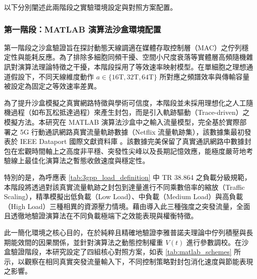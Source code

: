 以下分別闡述此兩階段之實驗環境設定與對照方案配置。

\subsubsection{第一階段：MATLAB 演算法沙盒環境配置}
第一階段之沙盒驗證旨在探討動態天線調適在媒體存取控制層（MAC）之佇列穩定性與能耗反應。為了排除多細胞同頻干擾、空間小尺度衰落等實體層高頻隨機雜訊對演算法理論特徵之干擾，本階段採用了等效速率映射模型。在單細胞之理想通道假設下，不同天線維度動作 $a \in \{16\mathrm{T}, 32\mathrm{T}, 64\mathrm{T}\}$ 所對應之頻譜效率與傳輸容量被設定為固定之等效速率差異。

為了提升沙盒模擬之真實網路特徵與學術可信度，本階段並未採用理想化之人工隨機過程（如布瓦松抵達過程）來產生封包，而是引入軌跡驅動（Trace-driven）之模擬方法。本研究在 MATLAB 演算法沙盒中之輸入流量模型，完全基於實際部署之 5G 行動通訊網路真實流量軌跡數據（Netflix 流量軌跡集），該數據集最初發表於 IEEE Dataport 國際文獻資料庫 \cite{ieeedataport2021_5gtraffic}。該數據完美保留了真實通訊網路中數據封包在宏觀時間軸上之高度非平穩、突發性尖峰以及長期記憶效應，能極度嚴苛地考驗線上最佳化演算法之暫態收斂速度與穩定性。

特別的是，為呼應表 \ref{tab:3gpp_load_definition} 中 TR 38.864 之負載分級規範，本階段將透過對該真實流量軌跡之封包到達量進行不同乘數倍率的縮放（Traffic Scaling），精準模擬出低負載（Low Load）、中負載（Medium Load）與高負載（High Load）三種相異的資源壓力情境。藉由導入此三種強度之突發流量，全面且透徹地驗證演算法在不同負載極端下之效能表現與權衡特徵。

此一簡化環境之核心目的，在於純粹且精確地驗證李雅普諾夫理論中佇列積壓與長期能效間的因果關係，並針對演算法之動態控制權重 $V(t)$ 進行參數調校。在沙盒驗證階段，本研究設定了四組核心對照方案，如表 \ref{tab:matlab_schemes} 所示，以觀察在相同真實突發流量輸入下，不同控制策略對封包消化速度與節能表現之影響。

